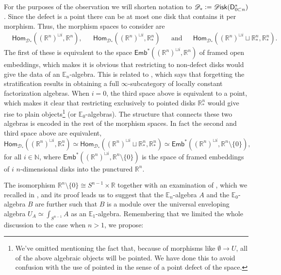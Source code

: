 \documentclass[../text.tex]{subfiles}
\begin{document}
\begin{observation}\label{obs:explore_D*}
    For the purposes of the observation we will shorten notation to $\mathscr{D}_* := \disk (\mathsf{D}_{0 \subset n}^*)$. Since the defect is a point there can be at most one disk that contains it per morphism. Thus, the morphism spaces to consider are
    \begin{align}
        &\mathsf{Hom}_{\mathscr{D}_*} ((\mathbb{R}^n)^{\sqcup i}, \mathbb{R}^n),& &\mathsf{Hom}_{\mathscr{D}_*} ((\mathbb{R}^n)^{\sqcup i}, \mathbb{R}^n_*)& &\mathrm{and}& &\mathsf{Hom}_{\mathscr{D}_*} ((\mathbb{R}^n)^{\sqcup i} \sqcup \mathbb{R}^n_*, \mathbb{R}^n_*).&
    \end{align}
    The first of these is equivalent to the space $\mathsf{Emb}^*((\mathbb{R}^n)^{\sqcup i}, \mathbb{R}^n)$ of framed open embeddings, which makes it is obvious that restricting to non-defect disks would give the data of an $\mathbb{E}_n$-algebra. This is related to , which says that forgetting the stratification results in obtaining a full $\infty$-subcategory of locally constant factorization algebras. When $i=0$, the third space above is equivalent to a point, which makes it clear that restricting exclusively to pointed disks $\mathbb{R}^n_*$ would give rise to plain objects\footnote{We've omitted mentioning the fact that, because of morphisms like $\emptyset \xrightarrow{} U$, all of the above algebraic objects will be pointed. We have done this to avoid confusion with the use of pointed in the sense of a point defect of the space.} (or $\mathbb{E}_0$-algebras). The structure that connects these two algebras is encoded in the rest of the morphism spaces. In fact the second and third space above are equivalent,
    \begin{equation}
        \mathsf{Hom}_{\mathscr{D}_*} ((\mathbb{R}^n)^{\sqcup i}, \mathbb{R}^n_*) \simeq \mathsf{Hom}_{\mathscr{D}_*} ((\mathbb{R}^n)^{\sqcup i} \sqcup \mathbb{R}^n_*, \mathbb{R}^n_*) \simeq \mathsf{Emb}^* ((\mathbb{R}^n)^{\sqcup i}, \mathbb{R}^n \setminus \{0\}),
    \end{equation}
    for all $i \in \mathbb{N}$, where $\mathsf{Emb}^* ((\mathbb{R}^n)^{\sqcup i}, \mathbb{R}^n \setminus \{0\})$ is the space of framed embeddings of $i$ $n$-dimensional disks into the punctured $\mathbb{R}^n$. %

    The isomorphism $\mathbb{R}^n \setminus \{ 0 \} \cong S^{n-1} \times \mathbb{R}$ together with an examination of \cite[prop.3.16]{francis2013}, which we recalled in , and its proof leads us to suggest that the $\mathbb{E}_n$-algebra $A$ and the $\mathbb{E}_0$-algebra $B$ are further such that $B$ is a module over the universal enveloping algebra $U_A \simeq \int_{S^{n-1}} A$ as an $\mathbb{E}_1$-algebra. Remembering that we limited the whole discussion to the case when $n>1$, we propose:
\end{observation}
\end{document}
